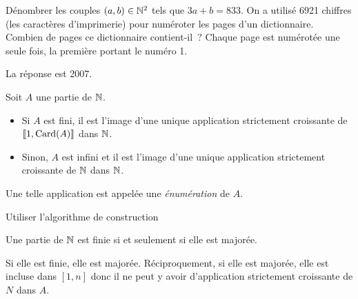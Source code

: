 \documentclass{magnolia}
\begin{document}
\begin{exoUnique}
\exo Dénombrer les couples $(a,b) \in \mathbb{N}^2$ tels que $3a + b = 833$.
\exo On a utilisé 6921 chiffres (les caractères d'imprimerie) pour numéroter les
  pages d'un dictionnaire. Combien de pages ce dictionnaire contient-il~?
  Chaque page est numérotée une seule fois, la première portant le numéro 1.
  \begin{sol}
  La réponse est 2007.
  \end{sol}
\end{exoUnique}

\begin{definition}
Soit $A$ une partie de $\mathbb{N}$.
\begin{itemize}
\item Si $A$ est fini, il est l'image d'une unique application
  strictement croissante de $\left\llbracket 1,\operatorname{Card}(A)\right\rrbracket$ dans $\mathbb{N}$.
\item Sinon, $A$ est infini et il est l'image d'une unique application strictement
  croissante de $\mathbb{N}$ dans $\mathbb{N}$.
\end{itemize}
Une telle application est appelée une \emph{énumération} de $A$.
\end{definition}

\begin{preuve}
Utiliser l'algorithme de construction
\end{preuve}


\begin{proposition}
Une partie de $\mathbb{N}$ est finie si et seulement si elle est majorée.
\end{proposition}

\begin{preuve}
Si elle est finie, elle est majorée.
Réciproquement, si elle est majorée, elle est incluse dans $[1,n]$ donc il ne
peut y avoir d'application strictement croissante de $N$ dans $A$.  
\end{preuve}


\end{document}
